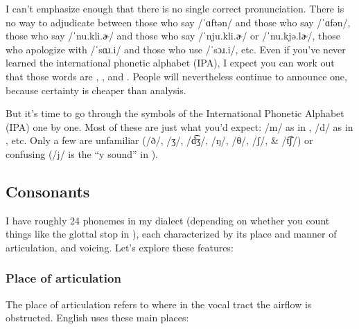 I can't emphasize enough that there is no single correct pronunciation. There is no way to adjudicate between those who say /ˈɑftən/ and those who say /ˈɑfən/, those who say /ˈnu.kli.ɚ/ and those who say /ˈnju.kli.ɚ/ or /ˈnu.kjə.lɚ/, those who apologize with /ˈsɑɹ.i/ and those who use /ˈsɔɹ.i/, etc. Even if you've never learned the international phonetic alphabet (IPA), I expect you can work out that those words are , , and . People will nevertheless continue to announce one, because certainty is cheaper than analysis.

But it's time to go through the symbols of the International Phonetic Alphabet (IPA) one by one. Most of these are just what you'd expect: /m/ as in , /d/ as in , etc. Only a few are unfamiliar (/ð/, /ʒ/, /d͡ʒ/, /ŋ/, /θ/, /ʃ/, \& /t͡ʃ/) or confusing (/j/ is the \enquote{y sound} in ).

\subsection{Consonants}

I have roughly 24  phonemes in my dialect (depending on whether you count things like the glottal stop in ), each characterized by its place and manner of articulation, and voicing. Let's explore these features:

\subsubsection{Place of articulation}

The place of articulation refers to where in the vocal tract the airflow is obstructed. English uses these main places:

